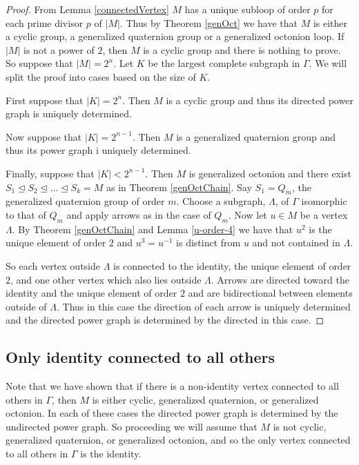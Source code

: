 \documentclass[12pt]{report}
\theoremstyle{definition}
\begin{document}
\begin{proof}
  From Lemma \ref{connectedVertex} $M$ has a unique subloop of order $p$ for each prime divisor $p$
   of $|M|$. Thus by Theorem \ref{genOct} we have that $M$ is either a cyclic group, a generalized quaternion
    group or a generalized octonion loop. If $|M|$ is not a power of $2$, then $M$ is a cyclic group and there
    is nothing to prove. So suppose that $|M| = 2^n$. Let $K$ be the largest complete subgraph in $\Gamma$.
    We will split the proof into cases based on the size of $K$.

  First suppose that $|K| = 2^n$. Then $M$ is a cyclic group and thus its directed power graph is
    uniquely determined.

  Now suppose that $|K| = 2^{n - 1}$. Then $M$ is a generalized quaternion group and thus its power graph i
    uniquely determined.

  Finally, suppose that $|K| < 2^{n - 1}$. Then $M$ is generalized octonion and there exist
    $S_1\unlhd S_2\unlhd \ldots \unlhd S_k = M$ as in Theorem \ref{genOctChain}. Say $S_1 = Q_m$, the
    generalized quaternion group of order $m$. Choose a subgraph, $\Lambda$, of $\Gamma$ isomorphic to that of $Q_m$
    and apply arrows as in the case of $Q_m$. Now let $u\in M$ be a vertex $\Lambda$. By Theorem
    \ref{genOctChain} and Lemma \ref{u-order-4} we have that $u^2$ is the unique element of order $2$ and
    $u^3 = u^{-1}$ is distinct from $u$ and not contained in $\Lambda$.

  So each vertex outside $\Lambda$ is connected to the identity, the unique element of order $2$, and one other vertex
    which also lies outside $\Lambda$. Arrows are directed toward the identity and the unique element of order $2$ and
    are bidirectional between elements outside of $\Lambda$. Thus in this case the direction of each arrow is
    uniquely determined and the directed power graph is determined by the directed in this case.
\end{proof}

\subsection{Only identity connected to all others}

  Note that we have shown that if there is a non-identity vertex connected to all others in $\Gamma$,
    then $M$ is either cyclic, generalized quaternion, or generalized octonion. In each of these
    cases the directed power graph is determined by the undirected power graph. So proceeding we will
    assume that $M$ is not cyclic, generalized quaternion, or generalized octonion, and so the only
    vertex connected to all others in $\Gamma$ is the identity.
\end{document}
